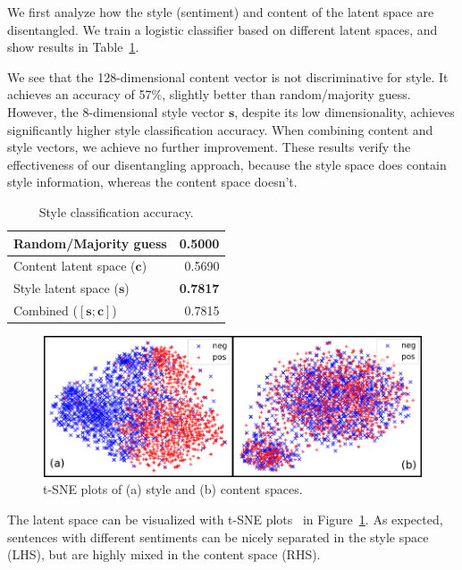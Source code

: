 We first analyze how the style (sentiment) and content of the latent space are disentangled. We train a logistic classifier based on different latent spaces, and show results in Table~\ref{tab:classification}.

We see that the 128-dimensional content vector is not discriminative for style. It achieves an accuracy of 57\%, slightly better than random/majority guess. However, the 8-dimensional style vector $\bm s$, despite its low dimensionality, achieves significantly higher style classification accuracy. When combining content and style vectors, we achieve no further improvement. These results verify the effectiveness of our disentangling approach, because the style space does contain style information, whereas the content space doesn't.


\begin{table}
	\centering
	\begin{tabular}{| l | r |}
		\hline
		Random/Majority guess           & 0.5000          \\ \hline
		Content latent space  ($\bm c$) & 0.5690          \\
		Style latent space ($\bm s$)    & \textbf{0.7817} \\
		Combined ($[\bm s;\bm c]$)      & 0.7815          \\
		\hline
	\end{tabular}
	\caption{Style classification accuracy.}
	\label{tab:classification}
\end{table}

\begin{figure}
	\includegraphics[width=\linewidth]{images/tsne-style-and-content}
	\caption{t-SNE plots of (a) style and (b) content spaces.}
	\label{fig:tsne}
\end{figure}


The latent space can be visualized with t-SNE plots~\cite{maaten2008visualizing} in Figure~\ref{fig:tsne}. As expected, sentences with different sentiments can be nicely separated in the style space (LHS), but are highly mixed in the content space (RHS).


